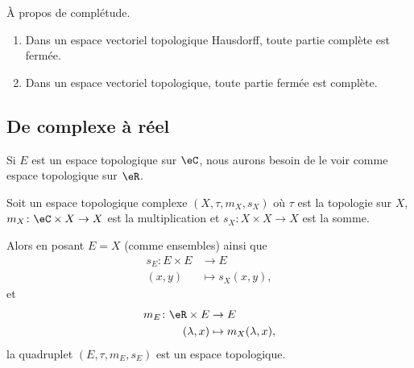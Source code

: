 \begin{proposition}	\label{PROPooRCSQooAgTRDi}
	À propos de complétude.
	\begin{enumerate}
		\item		\label{ITEMooVUXEooBQTpIM}
		      Dans un espace vectoriel topologique Hausdorff, toute partie complète est fermée.
		\item
		      Dans un espace vectoriel topologique, toute partie fermée est complète.
	\end{enumerate}
\end{proposition}



\subsection{De complexe à réel}

Si \( E\) est un espace topologique sur \( \eC\), nous aurons besoin de le voir comme espace topologique sur \( \eR\).

\begin{proposition}	\label{PROPooAIMVooYtZVJV}
	Soit un espace topologique complexe \( (X,\tau,m_X,s_X)\) où \( \tau\) est la topologie sur \( X\), \(m_X \colon \eC\times X\to X  \) est la multiplication et \(s_X \colon X\times X\to X  \) est la somme.

	Alors en posant \( E=X\) (comme ensembles) ainsi que
	\begin{equation}
		\begin{aligned}
			s_E\colon E\times E & \to E             \\
			(x,y)               & \mapsto s_X(x,y),
		\end{aligned}
	\end{equation}
	et
	\begin{equation}
		\begin{aligned}
			m_E\colon \eR\times E & \to E                   \\
			(\lambda,x)           & \mapsto m_X(\lambda,x),
		\end{aligned}
	\end{equation}
	la quadruplet \( (E,\tau,m_E,s_E)\) est un espace topologique.
\end{proposition}


